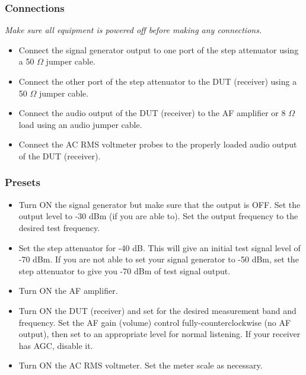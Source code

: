 \documentclass[10pt,letterpaper]{book}
\begin{document}
\subsubsection*{Connections}
\emph{Make sure all equipment is powered off before making any connections.}
\begin{itemize}
	\item Connect the signal generator output to one port of the step attenuator using a 50 $\Omega$ jumper cable.
	\item Connect the other port of the step attenuator to the DUT (receiver) using a 50 $\Omega$ jumper cable.
	\item Connect the audio output of the DUT (receiver) to the AF amplifier or 8 $\Omega$ load using an audio jumper cable.
	\item Connect the AC RMS voltmeter probes to the properly loaded audio output of the DUT (receiver).
\end{itemize}
\subsubsection*{Presets}
\begin{itemize}
	\item Turn ON the signal generator but make sure that the output is OFF. Set the output level to -30 dBm (if you are able to). Set the output frequency to the desired test frequency.
	\item Set the step attenuator for -40 dB. This will give an initial test signal level of -70 dBm. If you are not able to set your signal generator to -50 dBm, set the step attenuator to give you -70 dBm of test signal output.
	\item Turn ON the AF amplifier.
	\item Turn ON the DUT (receiver) and set for the desired measurement band and frequency. Set the AF gain (volume) control fully-counterclockwise (no AF output), then set to an appropriate level for normal listening. If your receiver has AGC, disable it.
	\item Turn ON the AC RMS voltmeter. Set the meter scale as necessary.
\end{itemize}
\end{document}
